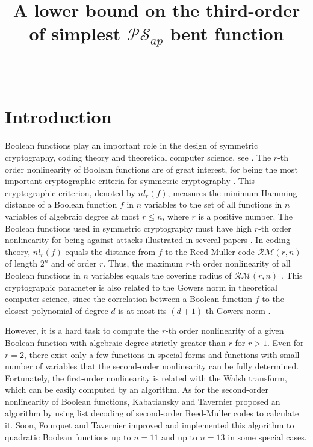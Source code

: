 \documentclass{article}
\title{ A lower bound on the third-order of simplest $\mathcal{PS}_{ap}$ bent function}
\newcommand{\0}{\textbf{0}}
\newcommand{\1}{\textbf{1}}
\theoremstyle{plain}
\begin{document}
  \noindent
  \rule{\linewidth}{0.4pt}


\section{Introduction}
    Boolean functions play an important role in the design of symmetric cryptography, coding theory and theoretical computer science, see \cite{Carlet2007book,BhattacharyyaKSSZ2010gowers,CohenHLL1997RMcodecover}. 
    The $r$-th order nonlinearity of Boolean functions are of great interest, for being the most important cryptographic criteria for symmetric cryptography \cite{Carlet2007book}. 
    This cryptographic criterion, denoted by $nl_r(f)$, measures the minimum Hamming distance of a Boolean function $f$ in $n$ variables to the set of all functions in $n$ variables of algebraic degree at most $r\le n$, where $r$ is a positive number. 
    The Boolean functions used in symmetric cryptography must have high $r$-th order nonlinearity for being against attacks illustrated in several papers \cite{Golic1996lower_order_approximation,IwataK1999highorderbentfunction,KnudsenR1996nonlinear_approximation,Courtois2002XL_algorithm_and_NL_r}. 
    In coding theory, $nl_r(f)$ equals the distance from $f$ to the Reed-Muller code $\mathcal{RM}(r,n)$ of length $2^n$ and of order $r$. 
    Thus, the maximum $r$-th order nonlinearity of all Boolean functions in $n$ variables equals the covering radius of $\mathcal{RM}(r,n)$ \cite{CohenHLL1997RMcodecover}. 
    This cryptographic parameter is also related to the Gowers norm in theoretical computer science, since the correlation between a Boolean function $f$ to the closest polynomial of degree $d$ is at most its $(d+1)$-th Gowers norm \cite{BhattacharyyaKSSZ2010gowers}. 

    However, it is a hard task to compute the $r$-th order nonlinearity of a given Boolean function with algebraic degree strictly greater than $r$ for $r>1$. 
    Even for $r=2$, there exist only a few functions in special forms and functions with small number of variables that the second-order nonlinearity can be fully determined. 
    Fortunately, the first-order nonlinearity is related with the Walsh transform, which can be easily computed by an algorithm. 
    As for the second-order nonlinearity of Boolean functions, Kabatiansky and Tavernier \cite{KabatianskyT2005listdecoding_RM_2_n} proposed an algorithm by using list decoding of second-order Reed-Muller codes to calculate it. 
    Soon, Fourquet and Tavernier \cite{FourquetT2008improved_listdecoding_RM_2_n} improved and implemented this algorithm to quadratic Boolean functions up to $n=11$ and up to $n=13$ in some special cases. 
\end{document}
